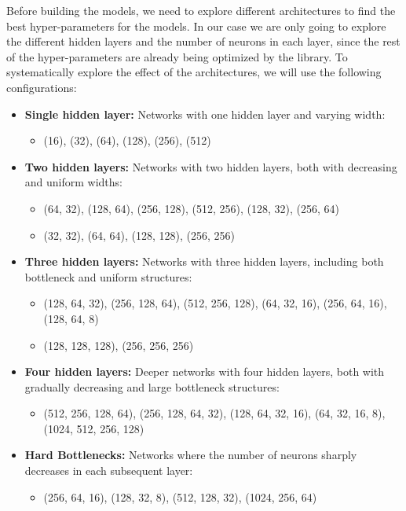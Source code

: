 \documentclass[11pt,english,a4paper,hidelinks]{book}
\begin{document}
\noindent Before building the models, we need to explore different architectures to find the best hyper-parameters for the models. In our case we are only going to explore the different hidden layers and the number of neurons in each layer, since the rest of the hyper-parameters are already being optimized by the library. To systematically explore the effect of the architectures, we will use the following configurations:

\begin{itemize}
    \item \textbf{Single hidden layer:} Networks with one hidden layer and varying width:
    \begin{itemize}
        \item (16), (32), (64), (128), (256), (512)
    \end{itemize}
    \item \textbf{Two hidden layers:} Networks with two hidden layers, both with decreasing and uniform widths:
    \begin{itemize}
        \item (64, 32), (128, 64), (256, 128), (512, 256), (128, 32), (256, 64)
        \item (32, 32), (64, 64), (128, 128), (256, 256)
    \end{itemize}
    \item \textbf{Three hidden layers:} Networks with three hidden layers, including both bottleneck and uniform structures:
    \begin{itemize}
        \item (128, 64, 32), (256, 128, 64), (512, 256, 128), (64, 32, 16), (256, 64, 16), (128, 64, 8)
        \item (128, 128, 128), (256, 256, 256)
    \end{itemize}
    \item \textbf{Four hidden layers:} Deeper networks with four hidden layers, both with gradually decreasing and large bottleneck structures:
    \begin{itemize}
        \item (512, 256, 128, 64), (256, 128, 64, 32), (128, 64, 32, 16), (64, 32, 16, 8), (1024, 512, 256, 128)
    \end{itemize}
    \item \textbf{Hard Bottlenecks:} Networks where the number of neurons sharply decreases in each subsequent layer:
    \begin{itemize}
        \item (256, 64, 16), (128, 32, 8), (512, 128, 32), (1024, 256, 64)
    \end{itemize}
\end{itemize}
\end{document}
